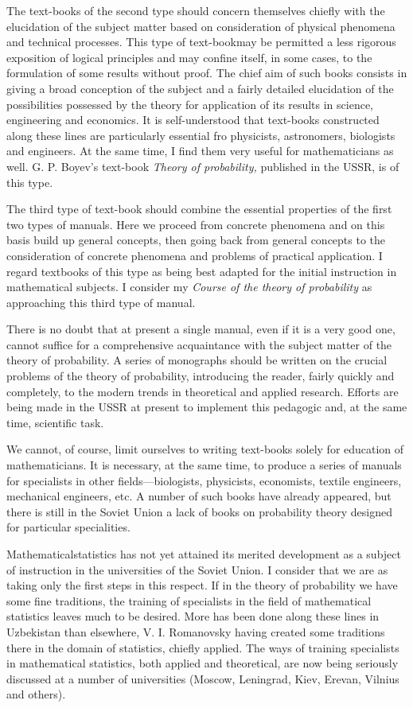 The text-books of the second type should concern themselves chiefly
with the elucidation of the subject matter based on consideration of
physical phenomena and technical processes. This type of text-book\pageoriginale may
be permitted a less rigorous exposition of logical principles and may
confine itself, in some cases, to the formulation of some results
without proof. The chief aim of such books consists in giving a broad
conception of the subject and a fairly detailed elucidation of the
possibilities possessed by the theory for application of its results
in science, engineering and economics. It is self-understood that
text-books constructed along these lines are particularly essential
fro physicists, astronomers, biologists and engineers. At the same
time, I find them very useful for mathematicians as
well. G. P. Boyev's text-book \textit{Theory of probability,}
published in the USSR, is of this type.

The third type of text-book should combine the essential properties of
the first two types of manuals. Here we proceed from concrete
phenomena and on this basis build up general concepts, then going back
from general concepts to the consideration of concrete phenomena and
problems of practical application. I regard textbooks of this type as
being best adapted for the initial instruction in mathematical
subjects. I consider my \textit{Course of the theory of probability}
as approaching this third type of manual.

There is no doubt that at present a single manual, even if it is a
very good one, cannot suffice for a comprehensive acquaintance with
the subject matter of the theory of probability. A series of
monographs should be written on the crucial problems of the theory of
probability, introducing the reader, fairly quickly and completely, to
the modern trends in theoretical and applied research. Efforts are
being made in the USSR at present to implement this pedagogic and, at
the same time, scientific task. 

We cannot, of course, limit ourselves to writing text-books solely for
education of mathematicians. It is necessary, at the same time, to
produce a series of manuals for specialists in other
fields---biologists, physicists, economists, textile engineers,
mechanical engineers, etc. A number of such books have already
appeared, but there is still in the Soviet Union a lack of books on
probability theory designed for particular specialities.

Mathematical\pageoriginale statistics has not yet attained its merited
development as a subject of instruction in the universities of the
Soviet Union. I consider that we are as taking only the first steps in
this respect. If in the theory of probability we have some fine
traditions, the training of specialists in the field of mathematical
statistics leaves much to be desired. More has been done along these
lines in Uzbekistan than elsewhere, V. I. Romanovsky having created
some traditions there in the domain of statistics, chiefly
applied. The ways of training specialists in mathematical statistics,
both applied and theoretical, are now being seriously discussed at a
number of universities (Moscow, Leningrad, Kiev, Erevan, Vilnius and others).

